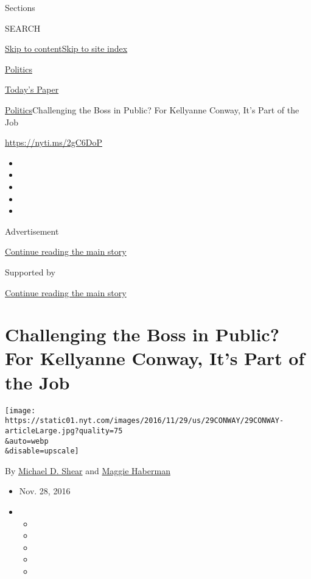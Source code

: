 Sections

SEARCH

\protect\hyperlink{site-content}{Skip to
content}\protect\hyperlink{site-index}{Skip to site index}

\href{https://www.nytimes.com/section/politics}{Politics}

\href{https://myaccount.nytimes.com/auth/login?response_type=cookie\&client_id=vi}{}

\href{https://www.nytimes.com/section/todayspaper}{Today's Paper}

\href{/section/politics}{Politics}\textbar{}Challenging the Boss in
Public? For Kellyanne Conway, It's Part of the Job

\url{https://nyti.ms/2gC6DoP}

\begin{itemize}
\item
\item
\item
\item
\item
\end{itemize}

Advertisement

\protect\hyperlink{after-top}{Continue reading the main story}

Supported by

\protect\hyperlink{after-sponsor}{Continue reading the main story}

\hypertarget{challenging-the-boss-in-public-for-kellyanne-conway-its-part-of-the-job}{%
\section{Challenging the Boss in Public? For Kellyanne Conway, It's Part
of the
Job}\label{challenging-the-boss-in-public-for-kellyanne-conway-its-part-of-the-job}}

\texttt{[image: https://static01.nyt.com/images/2016/11/29/us/29CONWAY/29CONWAY-articleLarge.jpg?quality=75\\\&auto=webp\\\&disable=upscale]}

By \href{http://www.nytimes.com/by/michael-d-shear}{Michael D. Shear}
and \href{http://www.nytimes.com/by/maggie-haberman}{Maggie Haberman}

\begin{itemize}
\item
  Nov. 28, 2016
\item
  \begin{itemize}
  \item
  \item
  \item
  \item
  \item
  \end{itemize}
\end{itemize}

